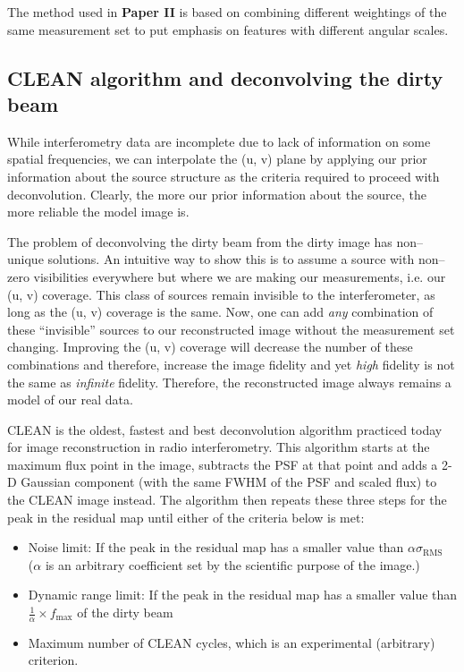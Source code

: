 \documentclass[a4wide,12pt]{book}
\begin{document}
The method used in {\bf Paper II} is based on combining different weightings of the same measurement set to put emphasis on features with different angular scales. 

\subsection*{CLEAN algorithm and deconvolving the dirty beam}
\label{sec:CLEAN}
While interferometry data are incomplete due to lack of information on some spatial frequencies, we can interpolate the (u, v) plane by applying our prior information about the source structure as the criteria required to proceed with deconvolution. Clearly, the more our prior information about the source, the more reliable the model image is.

The problem of deconvolving the dirty beam from the dirty image has non--unique solutions. An intuitive way to show this is to assume a source with non--zero visibilities everywhere but where we are making our measurements, i.e. our (u, v) coverage. This class of sources remain invisible to the interferometer, as long as the (u, v) coverage is the same. Now, one can add \emph{any} combination of these ``invisible'' sources to our reconstructed image without the measurement set changing. Improving the (u, v) coverage will decrease the number of these combinations and therefore, increase the image fidelity and yet \emph{high} fidelity is not the same as \emph{infinite} fidelity. Therefore, the reconstructed image always remains a model of our real data.

CLEAN \citep[][]{Hogbom1974} is the oldest, fastest and best deconvolution algorithm practiced today for image reconstruction in radio interferometry. This algorithm starts at the maximum flux point in the image, subtracts the PSF at that point and adds a 2-D Gaussian component (with the same FWHM of the PSF and scaled flux) to the CLEAN image instead. The algorithm then repeats these three steps for the peak in the residual map until either of the criteria below is met: 
\begin{itemize}
\item Noise limit: If the peak in the residual map has a smaller value than $\alpha \sigma_\mathrm{RMS}$
\\($\alpha$ is an arbitrary coefficient set by the scientific purpose of the image.)
\item Dynamic range limit: If the peak in the residual map has a smaller value than $\frac{1}{\alpha} \times f_\mathrm{max}$ of the dirty beam
\item Maximum number of CLEAN cycles, which is an experimental (arbitrary) criterion.
\end{itemize}
\end{document}
